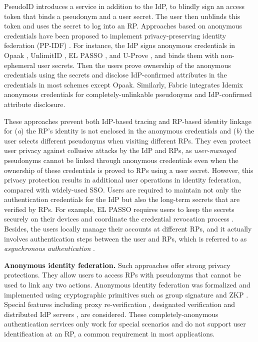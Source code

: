 PseudoID \cite{PseudoID} introduces a service in addition to the IdP,
 to blindly sign \cite{blind-sign}
an access token that binds a pseudonym and a user secret.
The user then unblinds this token and uses the secret to log into an RP. Approaches based on anonymous credentials \cite{anon-credential-2001, idemix, anon-credential} have been proposed to implement privacy-preserving identity federation (PP-IDF) \cite{hyperledge-idemix, Opaak, uprov, UnlimitID, ELPASSO}. For instance, the IdP signs anonymous credentials in Opaak \cite{Opaak}, UnlimitID \cite{UnlimitID}, EL PASSO \cite{ELPASSO}, and U-Prove \cite{uprov}, and binds them with non-ephemeral user secrets. %
Then the users prove ownership of the anonymous credentials using the secrets and disclose IdP-confirmed attributes in the credentials in most schemes except Opaak.
Similarly, Fabric \cite{hyperledge-idemix} integrates Idemix anonymous credentials \cite{idemix} for completely-unlinkable pseudonyms and IdP-confirmed attribute disclosure.


These approaches \cite{PseudoID,Opaak,ELPASSO,uprov,UnlimitID,hyperledge-idemix} prevent both IdP-based tracing and RP-based identity linkage for (\emph{a}) the RP's identity is not enclosed in the anonymous credentials and (\emph{b}) the user selects different pseudonyms when visiting different RPs.
They even protect user privacy against collusive attacks by the IdP and RPs, as \emph{user-managed} pseudonyms cannot be linked through anonymous credentials \cite{anon-credential-2001, idemix, anon-credential} even when the ownership of these credentials is proved to RPs using a user secret.
However, this privacy protection results in additional user operations in identity federation, compared with widely-used SSO.
Users are required to maintain not only the authentication credentials for the IdP but also the long-term secrets that are verified by RPs.
For example, EL PASSO \cite{ELPASSO} requires users to keep the secrets securely on their devices and coordinate the credential revocation process \cite{ELPASSO, UnlimitID}.
Besides, the users locally manage their accounts at different RPs, and it actually involves authentication steps between the user and RPs, which is referred to as \emph{asynchronous authentication} \cite{ELPASSO}.


\noindent\textbf{Anonymous identity federation.}
Such approaches offer strong privacy protections. They allow users to access RPs with pseudonyms that cannot be used to link any two actions.
Anonymous identity federation was formalized \cite{WangWS13} and implemented using cryptographic primitives such as group signature and ZKP \cite{WangWS13, HanCSTWW20, HanCSTW18}. Special features including proxy re-verification \cite{HanCSTWW20}, designated verification \cite{HanCSTW18} and distributed IdP servers \cite{TSAPP}, are considered. 
These completely-anonymous authentication services only work for special scenarios and do not support user identification at an RP, a common requirement in most applications.

